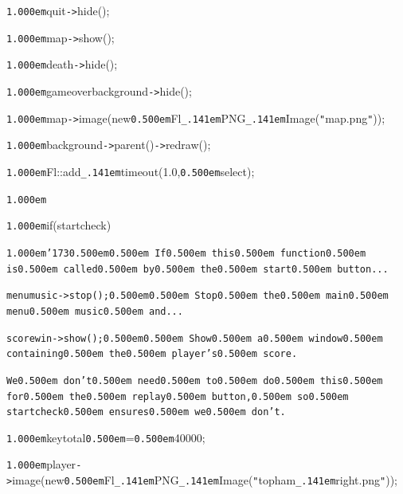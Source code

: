 \documentclass[12pt]{article}
\begin{document}
\noindent
{}{\tt\mc \kern1.000em}quit{\tt -}{\tt >}hide();

\noindent
{}{\tt\mc \kern1.000em}map{\tt -}{\tt >}show();

\noindent
{}{\tt\mc \kern1.000em}death{\tt -}{\tt >}hide();

\noindent
{}{\tt\mc \kern1.000em}gameoverbackground{\tt -}{\tt >}hide();

\noindent
{}{\tt\mc \kern1.000em}map{\tt -}{\tt >}image(new{\tt\mc \kern0.500em}Fl{\tt\_\kern.141em}PNG{\tt\_\kern.141em}Image({\tt "}map.png{\tt "}));

\noindent
{}{\tt\mc \kern1.000em}background{\tt -}{\tt >}parent(){\tt -}{\tt >}redraw();

\noindent
{}{\tt\mc \kern1.000em}Fl::add{\tt\_\kern.141em}timeout(1.0,{\tt\mc \kern0.500em}select);

\noindent
{}{\tt\mc \kern1.000em}

\noindent
{}{\tt\mc \kern1.000em}if(startcheck)

\noindent
{}{\tt\mc \kern1.000em}{\tt\char'173}{\tt\mc \kern0.500em}\tt\mc {\tt /}{\tt /}\kern0.500em If\kern0.500em this\kern0.500em function\kern0.500em is\kern0.500em called\kern0.500em by\kern0.500em the\kern0.500em start\kern0.500em button...

\noindent
\tt\mc {\tt\mc \kern1.000em}menumusic{\tt -}{\tt >}stop();{\tt\mc \kern0.500em}\rm\mc {\tt /}{\tt /}\kern0.500em Stop\kern0.500em the\kern0.500em main\kern0.500em menu\kern0.500em music\kern0.500em and...

\noindent
\tt\mc {\tt\mc \kern1.000em}scorewin{\tt -}{\tt >}show();{\tt\mc \kern0.500em}\rm\mc {\tt /}{\tt /}\kern0.500em Show\kern0.500em a\kern0.500em window\kern0.500em containing\kern0.500em the\kern0.500em player's\kern0.500em score.

\noindent
\tt{}\tt\mc {\tt /}{\tt /}We\kern0.500em don't\kern0.500em need\kern0.500em to\kern0.500em do\kern0.500em this\kern0.500em for\kern0.500em the\kern0.500em replay\kern0.500em button,\kern0.500em so\kern0.500em startcheck\kern0.500em ensures\kern0.500em we\kern0.500em don't.

\noindent
\tt\mc {\tt\mc \kern1.000em}

\noindent
{}{\tt\mc \kern1.000em}keytotal{\tt\mc \kern0.500em}={\tt\mc \kern0.500em}40000;

\noindent
{}{\tt\mc \kern1.000em}player{\tt -}{\tt >}image(new{\tt\mc \kern0.500em}Fl{\tt\_\kern.141em}PNG{\tt\_\kern.141em}Image({\tt "}topham{\tt\_\kern.141em}right.png{\tt "}));
\end{document}
